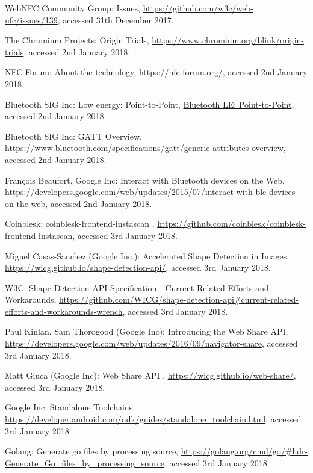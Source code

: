 \begin{thebibliography}{99}
WebNFC Community Group: Issues, \url{https://github.com/w3c/web-nfc/issues/139}, accessed 31th December 2017.

The Chromium Projects: Origin Trials, \url{https://www.chromium.org/blink/origin-trials}, accessed 2nd January 2018.

NFC Forum: About the technology, \url{https://nfc-forum.org/}, accessed 2nd January 2018.

Bluetooth SIG Inc: Low energy: Point-to-Point, \url{Bluetooth LE: Point-to-Point}, accessed 2nd January 2018.

Bluetooth SIG Inc: GATT Overview, \url{https://www.bluetooth.com/specifications/gatt/generic-attributes-overview}, accessed 2nd January 2018.

François Beaufort, Google Inc: Interact with Bluetooth devices on the Web, \url{https://developers.google.com/web/updates/2015/07/interact-with-ble-devices-on-the-web}, accessed 2nd January 2018.

Coinblesk: coinblesk-frontend-instascan
, \url{https://github.com/coinblesk/coinblesk-frontend-instascan}, accessed 3rd January 2018.

Miguel Casas-Sanchez (Google Inc.): Accelerated Shape Detection in Images, \url{https://wicg.github.io/shape-detection-api/}, accessed 3rd January 2018.

W3C: Shape Detection API Specification 
- Current Related Efforts and Workarounds, \url{https://github.com/WICG/shape-detection-api#current-related-efforts-and-workarounds-wrench}, accessed 3rd January 2018.

 Paul Kinlan, Sam Thorogood (Google Inc): Introducing the Web Share API, \url{https://developers.google.com/web/updates/2016/09/navigator-share}, accessed 3rd January 2018.

 Matt Giuca (Google Inc): Web Share API
, \url{https://wicg.github.io/web-share/}, accessed 3rd January 2018.

 Google Inc: Standalone Toolchains, \url{https://developer.android.com/ndk/guides/standalone_toolchain.html}, accessed 3rd January 2018.

 Golang: Generate go files by processing source, \url{https://golang.org/cmd/go/#hdr-Generate_Go_files_by_processing_source}, accessed 3rd January 2018.


\end{thebibliography}
